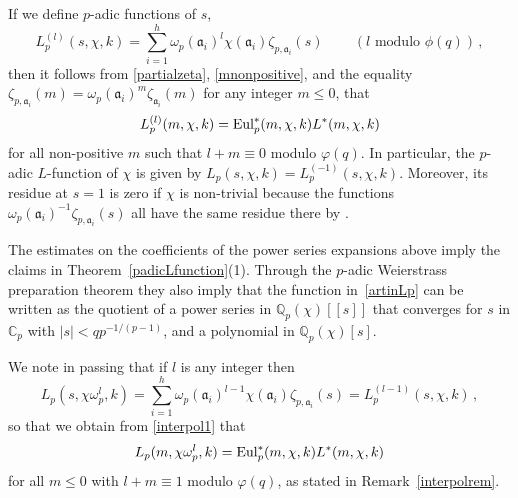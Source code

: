 \documentclass{amsart}
\begin{document}
If we define $p$-adic functions of $ s $,
\begin{equation}\label{merpL}
 L_p^{(l)}(s, \chi, k) =
\sum_{i=1}^h   \omega_p(\mathfrak{a}_i)^l \chi(\mathfrak{a}_i) \zeta_{p, \mathfrak{a}_i}(s) \,
\qquad (l \text{ modulo } \phi(q))
\,,
\end{equation}
then it follows from \eqref{partialzeta}, \eqref{mnonpositive}, and the equality
$ \zeta_{p,\mathfrak{a}_i}(m) = \omega_p(\mathfrak{a}_i)^m \zeta_{\mathfrak{a}_i}(m) $ for any integer $ m 
\le 0 $, that 
\begin{equation}\label{interpol1}
 L_p^{(l)}(m, \chi, k) = {\textup{Eul}}^\ast_p(m, \chi, k) L^\ast(m, \chi, k)
\end{equation}
for all non-positive $m$ such that $l + m \equiv 0 $ modulo $ \varphi(q) $.
In particular, the $p$-adic $L$-function of $\chi$ is given by ${L_{p}(s,{\chi},k)}= L_p^{(-1)}(s, \chi, k)$.
Moreover, its residue at $s=1$ is zero if $\chi$ is non-trivial
because the functions $\omega_p(\mathfrak{a}_i)^{-1}{\zeta}_{p,\mathfrak{a}_i}(s)$
all have the same residue there by \cite[Corollaire on page 388]{Colm88}.

The estimates on the coefficients of the power series expansions above imply the
claims in Theorem~\ref{padicLfunction}(1).  Through the {$p$-adic{\futurelet{}}} Weierstrass preparation theorem
they also imply that the function in~\eqref{artinLp} can be written as the quotient of a power series 
in $ {{\mathbb Q_p}}(\chi)[[s]] $ that converges
for $ s $ in $ {{\mathbb C_p}} $ with $ |s| < q p^{-1/(p-1)} $, and a polynomial in $ {{\mathbb Q_p}}(\chi)[s] $.

We note in passing that if $l$ is any integer then
\begin{equation*}
  {L_{p}(s,{\chi\omega_p^l},k)}
=
 \sum_{i=1}^h \omega_p(\mathfrak{a}_i)^{l-1} \chi(\mathfrak{a}_i)  \zeta_{p, \mathfrak{a}_i}(s)
=
L_p^{(l-1)}(s, \chi, k)
\,, 
\end{equation*}
so that we obtain from \eqref{interpol1} that
\begin{equation*}
 {L_{p}(m,{\chi\omega_p^l},k)}= {\textup{Eul}}^\ast_p(m, \chi, k) L^\ast(m, \chi, k) 
\end{equation*}
for all $m\le0$ with $l + m \equiv 1 $ modulo $ \varphi(q) $, as stated in Remark~\ref{interpolrem}.
\end{document}
